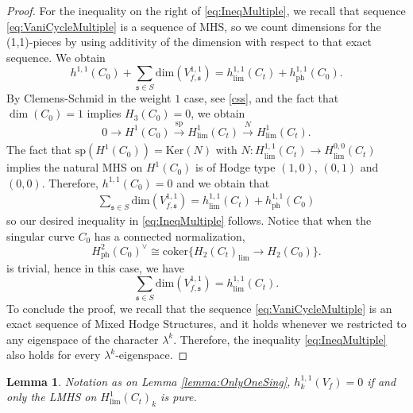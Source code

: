 \documentclass[12pt, letterpaper]{amsart}
\theoremstyle{plain}
\newtheorem{lemma}[theorem]{Lemma}
\theoremstyle{definition}
\newcommand{\s}{\mathfrak{s}}
\begin{document}
\begin{proof}
For the inequality on the right of \eqref{eq:IneqMultiple}, we recall that sequence \eqref{eq:VaniCycleMultiple} is a sequence of MHS, so we count dimensions for the (1,1)-pieces by using additivity of the dimension with respect to that exact sequence.  We obtain
\begin{equation}
    h^{1,1}(C_0) + \sum_{\s \in S}\mathrm{dim}(V_{f,\s}^{1,1})
    = 
     h^{1,1}_{\mathrm{lim}}(C_t) + h^{1,1}_{\mathrm{ph}}(C_0).
\end{equation}
By  Clemens-Schmid in the weight $1$ case, see \eqref{css}, and the fact that $\dim(C_0)=1$ implies $H_{3}(C_0) =0$, we obtain 
\begin{equation*}
0 \xrightarrow[]{}    H^1(C_0)
\xrightarrow{\mathrm{sp}}{}
H^1_{\mathrm{lim}}(C_t)
\xrightarrow{N}H^1_{\mathrm{lim}}(C_t).
\end{equation*}
The fact that $\mathrm{sp}\left(H^1(C_0)\right) = \mathrm{Ker}(N)$ with 
$N:H^{1,1}_{\mathrm{lim}}(C_t) \to H^{0,0}_{\mathrm{lim}}(C_t)$ implies the natural MHS on $H^1(C_0)$ is of Hodge type $(1,0)$, $(0,1)$ and $(0,0)$. Therefore,  $h^{1,1}(C_0) =0$ and  we obtain that
\begin{align*}
\sum_{\s \in S}\mathrm{dim}(V_{f,\s}^{1,1})
    = 
     h^{1,1}_{\mathrm{lim}}(C_t) + h^{1,1}_{\mathrm{ph}}(C_0)
\end{align*}
so our desired inequality in \eqref{eq:IneqMultiple} follows. Notice that  when the singular curve $C_0$ has a connected normalization, 
\begin{equation*}
H^{2}_{\mathrm{ph}}(C_0)^{\vee}\cong \mathrm{coker}\{H_2(C_t)_{\mathrm{lim}}\rightarrow H_2(C_0)\}. 
\end{equation*}
is trivial, hence in this case, we have
\begin{equation*}
    \sum_{\s\in S}\mathrm{dim}(V_{f,\s}^{1,1})
    = 
     h^{1,1}_{\mathrm{lim}}(C_t).
\end{equation*}
To conclude the proof, we recall that the sequence \eqref{eq:VaniCycleMultiple} is an exact sequence of Mixed Hodge Structures, and it holds whenever we restricted to any eigenspace of the character  $\lambda^k$.
Therefore, the inequality  \eqref{eq:IneqMultiple} also holds for every  $\lambda^k$-eigenspace. 
\end{proof}
\begin{lemma}\label{lemma:criteriaPure}
Notation as on Lemma \ref{lemma:OnlyOneSing},  $h_k^{1,1}(V_f) =0$ if and only the LMHS on $H^1_{\mathrm{lim}}(C_t)_k$ is pure. 
\end{lemma}
\end{document}
